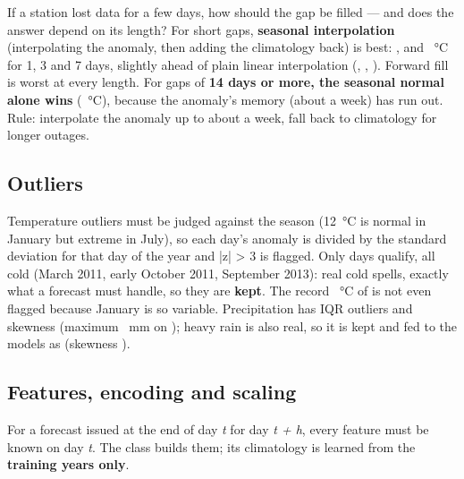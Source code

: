 \begin{table}[H]\centering\small
\caption{Imputation error (MAE in °C on the hidden days; best per gap length in bold).}\label{ts:tab-imputation}

\end{table}
\begin{finding}
\Q If a station lost data for a few days, how should the gap be filled — and does the answer depend on its length?
\F For short gaps, \textbf{seasonal interpolation} (interpolating the anomaly, then adding the climatology back) is best:
\TSImpSeasOne, \TSImpSeasThree{} and \TSImpSeasSeven~°C for 1, 3 and 7 days, slightly ahead of plain linear interpolation
(\TSImpLinOne, \TSImpLinThree, \TSImpLinSeven). Forward fill is worst at every length. For gaps of \textbf{14 days or more,
the seasonal normal alone wins} (\TSImpClimFourteen~°C), because the anomaly's memory (about a week) has run out. Rule:
interpolate the anomaly up to about a week, fall back to climatology for longer outages.
\end{finding}

\subsection{Outliers}
Temperature outliers must be judged against the season (12~°C is normal in January but extreme in July), so each day's anomaly
is divided by the standard deviation for that day of the year and |z| > 3 is flagged. Only \TSExtremes{} days qualify, all
cold (March 2011, early October 2011, September 2013): real cold spells, exactly what a forecast must handle, so they are
\textbf{kept}. The record \TSColdest~°C of \TSColdestDate{} is not even flagged because January is so variable.
Precipitation has \TSRainOutliers{} IQR outliers and skewness \TSRainSkew{} (maximum \TSRainMax~mm on \TSRainMaxDate); heavy
rain is also real, so it is kept and fed to the models as  (skewness \TSRainSkewLog).

\subsection{Features, encoding and scaling}
For a forecast issued at the end of day \emph{t} for day \emph{t + h}, every feature must be known on day \emph{t}. The class
 builds them; its climatology is learned from the \textbf{training years only}.


